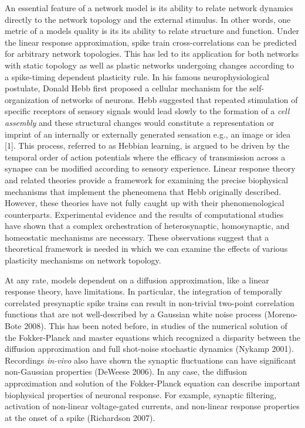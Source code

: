\documentclass{ucetd}
\begin{document}
An essential feature of a network model is its ability to relate network dynamics directly to the network topology and the external stimulus. In other words, one metric of a models quality is its its ability to relate structure and function. Under the linear response approximation, spike train cross-correlations can be predicted for arbitrary network topologies. This has led to its application for both networks with static topology as well as plastic networks undergoing changes according to a spike-timing dependent plasticity rule. In his famous neurophysiological postulate, Donald Hebb first proposed a cellular mechanism for the self-organization of networks of neurons. Hebb suggested that repeated stimulation of specific receptors of sensory signals would lead slowly to the formation of a \emph{cell assembly} and these structural changes would constitute a representation or imprint of an internally or externally generated sensation e.g., an image or idea [1]. This process, referred to as Hebbian learning, is argued to be driven by the temporal order of action potentials where the efficacy of transmission across a synapse can be modified according to sensory experience. Linear response theory and related theories provide a framework for examining the precise biophysical mechanisms that implement the pheneomena that Hebb originally described. However, these theories have not fully caught up with their phenomenological counterparts. Experimental evidence and the results of computational studies have shown that a complex orchestration of heterosynaptic, homosynaptic, and homeostatic mechanisms are necessary. These observations suggest that a theoretical framework is needed in which we can examine the effects of various plasticity mechanisms on network topology. 

At any rate, models dependent on a diffusion approximation, like a linear response theory, have limitations. In particular, the integration of temporally correlated presynaptic spike trains can result in non-trivial two-point correlation functions that are not well-described by a Gaussian white noise process (Moreno-Bote 2008). This has been noted before, in studies of the numerical solution of the Fokker-Planck and master equations which recognized a disparity between the diffusion approximation and full shot-noise stochastic dynamics (Nykamp 2001). Recordings \emph{in-vivo} also have shown the synaptic fluctuations can have significant non-Gaussian properties (DeWeese 2006). In any case, the diffusion approximation and solution of the Fokker-Planck equation can describe important biophysical properties of neuronal response. For example, synaptic filtering, activation of non-linear voltage-gated currents, and non-linear response properties at the onset of a spike (Richardson 2007).
\end{document}
